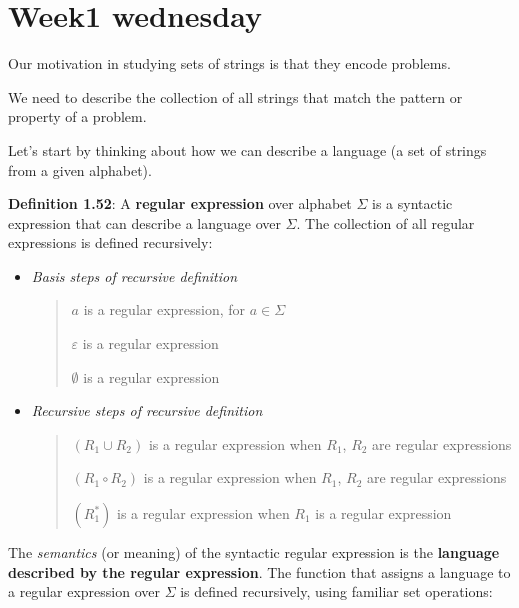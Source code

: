 \documentclass[12pt, oneside]{article}
\begin{document}
\section*{Week1 wednesday}


Our motivation in studying sets of strings is that they encode problems.

We need to describe the collection of all strings that match the pattern or property of a problem.

Let's start by thinking about how we can describe a language (a set of strings from a given alphabet).

\vfill


{\bf Definition 1.52}: A {\bf regular expression} over alphabet $\Sigma$
is a syntactic expression that can describe a language over $\Sigma$. The collection of all regular
expressions is defined recursively:
\begin{itemize}
\item[] {\it Basis steps of recursive definition}
\begin{quote}    
    $a$ is a regular expression, for $a \in \Sigma$

    $\varepsilon$ is a regular expression

    $\emptyset$ is a regular expression
\end{quote}

\item[] {\it Recursive steps of recursive definition}
\begin{quote}
    $(R_1 \cup R_2)$ is a regular expression when $R_1$, $R_2$ are regular expressions 

    $(R_1 \circ R_2)$ is a regular expression when $R_1$, $R_2$ are regular expressions

    $(R_1^*)$ is a regular expression when $R_1$ is a regular expression 
\end{quote}
\end{itemize}
 

The {\it semantics} (or meaning) of the syntactic regular expression is the {\bf language
described by the regular expression}. The function that assigns a language to a regular expression
over $\Sigma$ is defined recursively, using familiar set operations:
\end{document}
